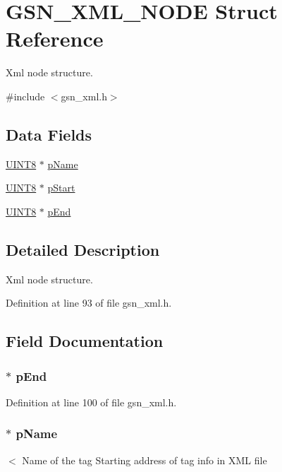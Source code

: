\hypertarget{a00434}{
\section{GSN\_\-XML\_\-NODE Struct Reference}
\label{a00434}
}


Xml node structure.  




{\ttfamily \#include $<$gsn\_\-xml.h$>$}

\subsection*{Data Fields}
\begin{DoxyCompactItemize}
\item 
\hyperlink{a00660_gab27e9918b538ce9d8ca692479b375b6a}{UINT8} $\ast$ \hyperlink{a00434_a9f24bc0b240cf182a580ac39c83e01bf}{pName}
\item 
\hyperlink{a00660_gab27e9918b538ce9d8ca692479b375b6a}{UINT8} $\ast$ \hyperlink{a00434_a2a5c3e1de1bdf3a69f40712b55858f10}{pStart}
\item 
\hyperlink{a00660_gab27e9918b538ce9d8ca692479b375b6a}{UINT8} $\ast$ \hyperlink{a00434_a8ce24907fc23c237a7f62d56098adfa4}{pEnd}
\end{DoxyCompactItemize}


\subsection{Detailed Description}
Xml node structure. 

Definition at line 93 of file gsn\_\-xml.h.



\subsection{Field Documentation}
\hypertarget{a00434_a8ce24907fc23c237a7f62d56098adfa4}{
\subsubsection[{pEnd}]{$\ast$ {\bf pEnd}}}
\label{a00434_a8ce24907fc23c237a7f62d56098adfa4}


Definition at line 100 of file gsn\_\-xml.h.

\hypertarget{a00434_a9f24bc0b240cf182a580ac39c83e01bf}{
\subsubsection[{pName}]{$\ast$ {\bf pName}}}
\label{a00434_a9f24bc0b240cf182a580ac39c83e01bf}
$<$ Name of the tag Starting address of tag info in XML file 

